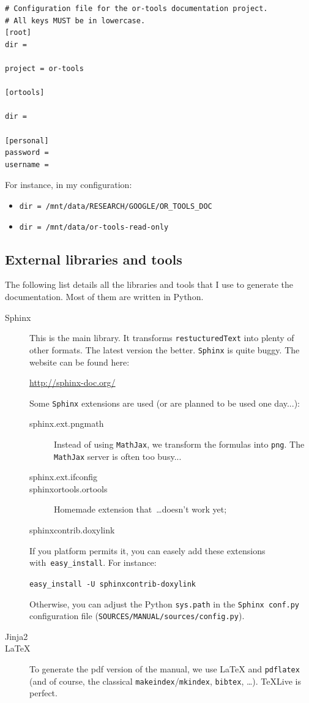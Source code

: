 \documentclass[a4paper,10pt]{article}
\newcommand{\code}[1]{\texttt{#1}}
\begin{document}
\begin{verbatim}
# Configuration file for the or-tools documentation project.
# All keys MUST be in lowercase.
[root]
dir = 

project = or-tools

[ortools]

dir = 

[personal]
password = 
username = 
\end{verbatim}

For instance, in my configuration:

\begin{itemize}
\item \code{dir = /mnt/data/RESEARCH/GOOGLE/OR\_TOOLS\_DOC}
\item \code{dir = /mnt/data/or-tools-read-only}
\end{itemize}

\subsection{External libraries and tools}

The following list details all the libraries and tools that I use to generate the documentation. Most of them are written in Python.

\begin{description}
 \item[Sphinx] This is the main library. It transforms \verb+restucturedText+ into plenty of other formats. The latest version the better. \code{Sphinx} is quite buggy. The website can be found here:

\href{http://sphinx-doc.org/}{http://sphinx-doc.org/}

Some \code{Sphinx} extensions are used (or are planned to be used one day...):
 \begin{description}
\item[sphinx.ext.pngmath] Instead of using \code{MathJax}, we transform the formulas into \code{png}. The \code{MathJax} server is often too busy...
\item[sphinx.ext.ifconfig]
\item[sphinxortools.ortools] Homemade extension that~\ldots doesn't work yet;
\item[sphinxcontrib.doxylink] 

\end{description}

If you platform permits it, you can easely add these extensions with~\code{easy\_install}. For instance:

\code{easy\_install -U sphinxcontrib-doxylink}

Otherwise, you can adjust the Python \code{sys.path} in the \code{Sphinx conf.py} configuration file (\code{SOURCES/MANUAL/sources/config.py}).

 \item[Jinja2] 
 \item[\LaTeX] To generate the pdf version of the manual, we use \LaTeX{} and \verb+pdflatex+ (and of course, the classical \verb+makeindex+/\verb+mkindex+, \verb+bibtex+, \ldots). \TeX Live is perfect.
 \end{description}
\end{document}
